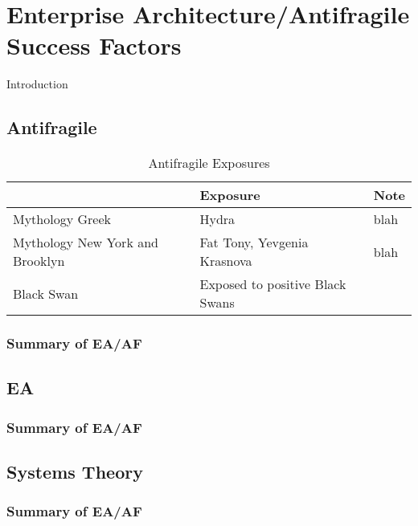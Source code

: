 \chapter{Enterprise Architecture/Antifragile Success Factors}
\label{chap:eaafsuccessfactors}

Introduction

\section{Antifragile}
\label{sec:sfantifragile}

\parencite[p. 23-27]{Taleb2012}
\begin{longtable}{p{}p{}p{}}
	& \textbf{Exposure} & \textbf{Note} \\ \midrule%
	\endhead%
	\hline
	\caption{Antifragile Exposures}
	\label{tab:sfantifragile types of exposure}	
	\endfoot%
	Mythology Greek & Hydra & blah \\
	Mythology New York and Brooklyn & Fat Tony, Yevgenia Krasnova & blah \\
	Black Swan & Exposed to positive Black Swans & \\
	
	\bottomrule
\end{longtable}

\subsection{Summary of EA/AF}
\label{sub:sfsummaryantifragile}

\section{EA}
\label{sec:sfenterprisearchitecture}

\subsection{Summary of EA/AF}
\label{sub:sfsummaryenterprisearchitecture}

\section{Systems Theory}
\label{sec:sfsystemstheory}

\subsection{Summary of EA/AF}
\label{sub:sfsummarysystemstheory}

